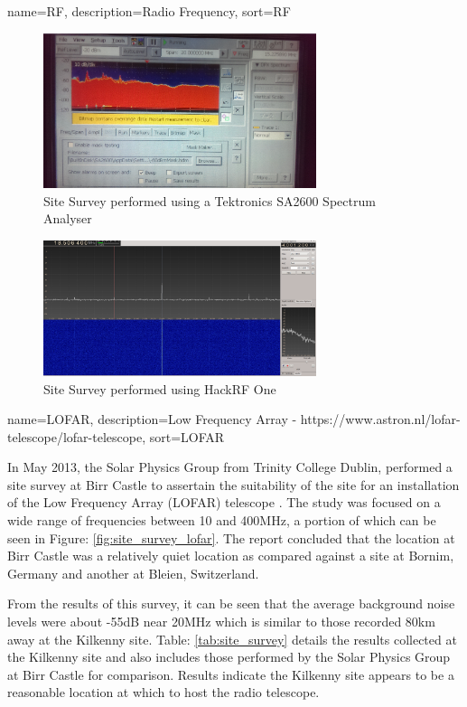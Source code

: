 \documentclass[runningheads,a4paper]{llncs}
\begin{document}
{
  name={RF},
  description={Radio Frequency},
  sort=RF
}

%
\begin{figure}[here]
\centering
\includegraphics[width=8cm]{images/26}
\caption{Site Survey performed using a Tektronics SA2600 Spectrum Analyser}
\label{fig:site_survey_spec_analyser}
\end{figure}
%

%
\begin{figure}[here]
\centering
\includegraphics[width=8cm]{images/31}
\caption{Site Survey performed using HackRF One}
\label{fig:site_survey_hackrf}
\end{figure}
%

{
  name={LOFAR},
  description={Low Frequency Array - https://www.astron.nl/lofar-telescope/lofar-telescope},
  sort=LOFAR
}

In May 2013, the Solar Physics Group from Trinity College Dublin, performed a site survey at Birr Castle to assertain the suitability of the site for an installation of the Low Frequency Array (\gls{LOFAR}) telescope \citep{craf-13}. The study was focused on a wide range of frequencies between 10 and 400MHz, a portion of which can be seen in Figure: \ref{fig:site_survey_lofar}. The report concluded that the location at Birr Castle was a relatively quiet location as compared against a site at Bornim, Germany and another at Bleien, Switzerland. 

From the results of this survey, it can be seen that the average background noise levels were about -55dB near 20MHz which is similar to those recorded 80km away at the Kilkenny site. Table: \ref{tab:site_survey} details the results collected at the Kilkenny site and also includes those performed by the Solar Physics Group at Birr Castle for comparison. Results indicate the Kilkenny site appears to be a reasonable location at which to host the radio telescope.
\end{document}
